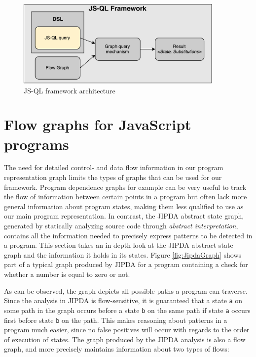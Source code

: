 \begin{figure}
    \centering
      \includegraphics[width=0.9\textwidth]{images/Architecture} 
      \caption{JS-QL framework architecture}
    \label{fig:architecture}
\end{figure}
\section{Flow graphs for JavaScript programs}
\label{sec:FlowGraphs}
The need for detailed control- and data flow information in our program representation graph limits the types of graphs that can be used for our framework. Program dependence graphs\cite{PDG} for example can be very useful to track the flow of information between certain points in a program but often lack more general information about program states, making them less qualified to use as our main program representation. In contrast, the JIPDA\cite{functionPurity} abstract state graph, generated by statically analyzing source code through \textit{abstract interpretation}, contains all the information needed to precisely express patterns to be detected in a program. This section takes an in-depth look at the JIPDA abstract state graph and the information it holds in its states. Figure \ref{fig:JipdaGraph} shows part of a typical graph produced by JIPDA for a program containing a check for whether a number is equal to zero or not.

As can be observed, the graph depicts all possible paths a program can traverse. Since the analysis in JIPDA is flow-sensitive, it is guaranteed that a state \texttt{a} on some path in the graph occurs before a state \texttt{b} on the same path if state \texttt{a} occurs first before state \texttt{b} on the path. This makes reasoning about patterns in a program much easier, since no false positives will occur with regards to the order of execution of states. The graph produced by the JIPDA analysis is also a flow graph, and more precisely maintains information about two types of flows:

